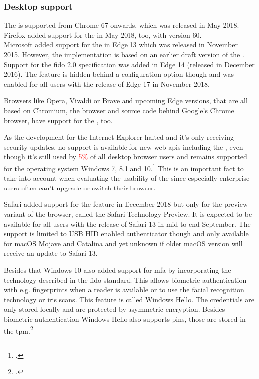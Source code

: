 \newpage

\subsubsection{Desktop support}

The \wa{} is supported from Chrome 67 onwards, which was released in May 2018. Firefox added support for the \wa{} in May 2018, too, with version 60.\\
Microsoft added support for the \wa{} in Edge 13 which was released in November 2015. However, the implementation is based on an earlier draft version of the \wa. Support for the \gls{fido} 2.0 specification was added in Edge 14 (released in December 2016). The feature is hidden behind a configuration option though and was enabled for all users with the release of Edge 17 in November 2018.

Browsers like Opera, Vivaldi or Brave and upcoming Edge versions, that are all based on Chromium, the browser and source code behind Google's Chrome browser, have support for the \wa, too.

As the development for the Internet Explorer halted and it's only receiving security updates, no support is available for new web \glspl{api} including the \wa, even though it's still used by \textcolor{red}{5\%} of all desktop browser users and remains supported for the operating system Windows 7, 8.1 and 10.\footcite[See][]{ie-support}
 This is an important fact to take into account when evaluating the usability of the \wa{} since especially enterprise users often can't upgrade or switch their browser.

Safari added support for the \wa{} feature in December 2018 but only for the preview variant of the browser, called the Safari Technology Preview. It is expected to be available for all users with the release of Safari 13 in mid to end September. The support is limited to USB HID enabled authenticator though and only available for macOS Mojave and Catalina and yet unknown if older macOS version will receive an update to Safari 13.

Besides that Windows 10 also added support for \gls{mfa} by incorporating the technology described in the \gls{fido} standard. This allows biometric authentication with e.g. fingerprints when a reader is available or to use the facial recognition technology or iris scans. This feature is called \frqq Windows Hello\flqq{}. The credentials are only stored locally and are protected by asymmetric encryption. Besides biometric authentication Windows Hello also supports \glspl{pin}, those are stored in the \gls{tpm}.\footcite{201612}

